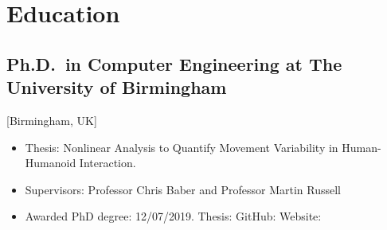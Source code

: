 \documentclass{mycv}
\begin{document}
\maketitle


\footnotesize

\section{Education}
\subsection{Ph.D.\ in Computer Engineering at The University of Birmingham}[Birmingham, UK]
\begin{itemize}[label={}]
  \item Thesis: Nonlinear Analysis to Quantify Movement Variability in Human-Humanoid Interaction. 
  \item Supervisors: Professor Chris Baber and  Professor Martin Russell
  \item	Awarded PhD degree: 12/07/2019. Thesis: \href{https://doi.org/10.5281/zenodo.3384145}{\faFilePdfO}
	GitHub: \href{http://doi.org/10.5281/zenodo.3384281}{\faGithubAlt}
	Website: \href{https://mxochicale-phd.github.io/site/}{\faExternalLink} 
\end{itemize}
\end{document}
